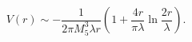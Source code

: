 \begin{equation}
\label{rev13}
V(r) \sim -\frac{1}{2 \pi M_5^3 \lambda r}
\left( 1 + \frac{4 r}{\pi \lambda} \ln \frac{2 r}{\lambda} \right).
\end{equation}


